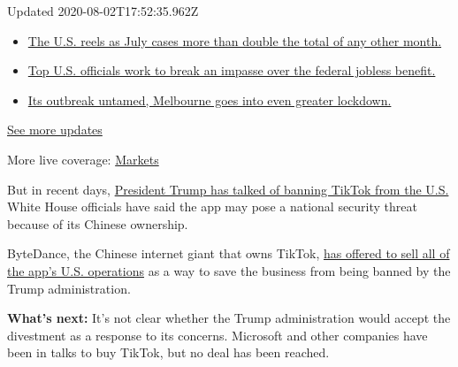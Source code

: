 Updated 2020-08-02T17:52:35.962Z

\begin{itemize}
\tightlist
\item
  \href{https://www.nytimes3xbfgragh.onion/2020/08/01/world/coronavirus-covid-19.html?action=click\&pgtype=Article\&state=default\&region=MAIN_CONTENT_1\&context=storylines_live_updates\#link-34047410}{The
  U.S. reels as July cases more than double the total of any other
  month.}
\item
  \href{https://www.nytimes3xbfgragh.onion/2020/08/01/world/coronavirus-covid-19.html?action=click\&pgtype=Article\&state=default\&region=MAIN_CONTENT_1\&context=storylines_live_updates\#link-780ec966}{Top
  U.S. officials work to break an impasse over the federal jobless
  benefit.}
\item
  \href{https://www.nytimes3xbfgragh.onion/2020/08/01/world/coronavirus-covid-19.html?action=click\&pgtype=Article\&state=default\&region=MAIN_CONTENT_1\&context=storylines_live_updates\#link-2bc8948}{Its
  outbreak untamed, Melbourne goes into even greater lockdown.}
\end{itemize}

\href{https://www.nytimes3xbfgragh.onion/2020/08/01/world/coronavirus-covid-19.html?action=click\&pgtype=Article\&state=default\&region=MAIN_CONTENT_1\&context=storylines_live_updates}{See
more updates}

More live coverage:
\href{https://www.nytimes3xbfgragh.onion/live/2020/07/31/business/stock-market-today-coronavirus?action=click\&pgtype=Article\&state=default\&region=MAIN_CONTENT_1\&context=storylines_live_updates}{Markets}

But in recent days,
\href{https://www.nytimes3xbfgragh.onion/2020/08/01/technology/tiktok-trump-microsoft-bytedance-china-ban.html}{President
Trump has talked of banning TikTok from the U.S.} White House officials
have said the app may pose a national security threat because of its
Chinese ownership.

ByteDance, the Chinese internet giant that owns TikTok,
\href{https://www.nytimes3xbfgragh.onion/2020/08/01/technology/tiktok-sale-trump-ban.html}{has
offered to sell all of the app's U.S. operations} as a way to save the
business from being banned by the Trump administration.

\textbf{What's next:} It's not clear whether the Trump administration
would accept the divestment as a response to its concerns. Microsoft and
other companies have been in talks to buy TikTok, but no deal has been
reached.

